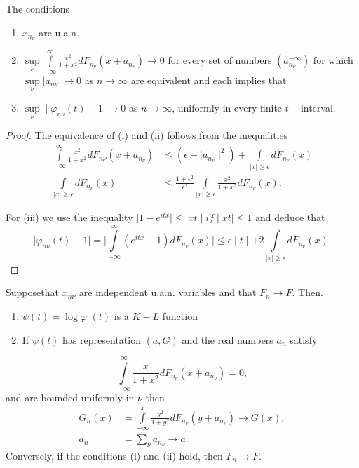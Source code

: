  \begin{theorem}\label{chap2:sec10:thm31} %
The conditions 
 
 \begin{enumerate}[\rm (i)]
 \item $x_{n_\nu }$ are u.a.n.
 \item $\sup\limits_\nu \int\limits^\infty_{- \infty}\frac{x^2}{1+x^2}  d
   F_{n_\nu}\left(x+a_{n_\nu}\right) \rightarrow 0 $ for every set of
   numbers  $\left(a^{-\infty}_{n_\nu}\right)$ for which  $\sup\limits_\nu
   \big| a_{n\nu} \big|  \rightarrow 0$ as $n \rightarrow \infty$ 
 are equivalent and each implies that 
 \item $\sup\limits_\nu \mid \varphi_{n\nu}(t) -1\mid \rightarrow 0$ as $n
  \rightarrow \infty $, uniformly in every finite  $t-$interval.
  \end{enumerate}
 \end{theorem}

\begin{proof}
   The equivalence of (i) and (ii) follows from the inequalities
   \begin{align*}
     \int\limits^{\infty}_{-\infty} \frac{x^2}{1+x^2}dF_{n\nu}(x+a_{n_\nu})& \le  
     (\epsilon + \mid a_{n_\nu}\mid^2) +  \int\limits_{\mid x \mid \ge
       \epsilon}dF_{n_\nu} (x)\\ 
     \int\limits_{\mid x \mid \ge \epsilon} dF_{n_\nu} (x) &\le
     \frac{1+\epsilon^2}{\epsilon^2}  \int\limits_{\mid x \mid \ge
       \epsilon} \frac{x^2}{1+x^2}   dF_{n_\nu} (x).
   \end{align*}
   
   For (iii) we use the inequality $ \mid 1-e^ {itx} \mid \le \mid xt
   \mid if \mid xt \mid \le 1 $  and deduce that  
   $$ 
   \mid \varphi_ {n \nu}(t) -1 \mid = \mid \int\limits_{ -\infty
   }^\infty(e^{itx} - 1) dF_{n_\nu}(x) \mid \le \epsilon \mid t \mid +
   2 \int\limits_{\mid x\mid \ge \epsilon } dF_{n_\nu } (x). 
   $$
 \end{proof}
 
\begin{theorem}\label{chap2:sec10:thm32} %
   Suppose\pageoriginale that $x_{n\nu}$ are independent
   u.a.n. variables and that $F_n \rightarrow F$. Then. 
   \begin{enumerate}[\rm (i)] 
   \item $\psi (t) =\log \varphi$ $(t)$ is a $K-L$ function 
   \item If $\psi (t)$ has representation $(a, G)$ and the real numbers 
     $a_n $ satisfy
   \end{enumerate}
   $$ 
   \int\limits_{-\infty }^\infty \frac{x}{1+ x^2} d F_{n_\nu}(x+a_{n_\nu})=0, 
   $$
   and are bounded uniformly in $\nu$ then 
   \begin{align*}
     G_n(x) & = \int\limits_{-\infty}^x
     \frac{y^2}{1+y^2}dF_{n_\nu}(y+a_{n_\nu})\rightarrow G(x),\\
     a_n &= \sum\limits_{\nu}a_{n_\nu }\rightarrow a. 
   \end{align*}
   Conversely, if the conditions (i) and (ii) hold, then $F_n \rightarrow F$. 
\end{theorem}
 
